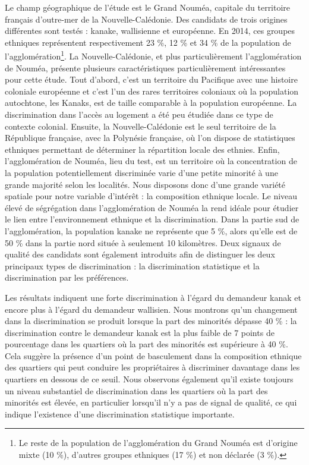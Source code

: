 \documentclass{Revue-economique} %
\begin{document}
\begin{Article}
Le champ géographique de l’étude est le Grand Nouméa, capitale du territoire français d’outre-mer de la Nouvelle-Calédonie. Des candidats de trois origines différentes sont testés : kanake, wallisienne et européenne. En 2014, ces groupes ethniques représentent respectivement 23 \%, 12 \% et 34 \% de la population de l’agglomération\footnote{Le reste de la population de l’agglomération du Grand Nouméa est d’origine mixte (10 \%), d’autres groupes ethniques (17 \%) et non déclarée (3 \%).}. La Nouvelle-Calédonie, et plus particulièrement l’agglomération de Nouméa, présente plusieurs caractéristiques particulièrement intéressantes pour cette étude. Tout d’abord, c’est un territoire du Pacifique avec une histoire coloniale européenne et c’est l’un des rares territoires coloniaux où la population autochtone, les Kanaks, est de taille comparable à la population européenne. La discrimination dans l’accès au logement a été peu étudiée dans ce type de contexte colonial. Ensuite, la Nouvelle-Calédonie est le seul territoire de la République française, avec la Polynésie française, où l’on dispose de statistiques ethniques permettant de déterminer la répartition locale des ethnies. Enfin, l’agglomération de Nouméa, lieu du test, est un territoire où la concentration de la population potentiellement discriminée varie d’une petite minorité à une grande majorité selon les localités. Nous disposons donc d’une grande variété spatiale pour notre variable d’intérêt : la composition ethnique locale. Le niveau élevé de ségrégation dans l’agglomération de Nouméa la rend idéale pour étudier le lien entre l’environnement ethnique et la discrimination. Dans la partie sud de l’agglomération, la population kanake ne représente que 5 \%, alors qu’elle est de 50 \% dans la partie nord située à seulement 10 kilomètres. Deux signaux de qualité des candidats sont également introduits afin de distinguer les deux principaux types de discrimination : la discrimination statistique et la discrimination par les préférences.

Les résultats indiquent une forte discrimination à l’égard du demandeur kanak et encore plus à l’égard du demandeur wallisien. Nous montrons qu’un changement dans la discrimination se produit lorsque la part des minorités dépasse 40 \% : la discrimination contre le demandeur kanak est la plus faible de 7 points de pourcentage dans les quartiers où la part des minorités est supérieure à 40 \%. Cela suggère la présence d’un point de basculement dans la composition ethnique des quartiers qui peut conduire les propriétaires à discriminer davantage dans les quartiers en dessous de ce seuil. Nous observons également qu’il existe toujours un niveau substantiel de discrimination dans les quartiers où la part des minorités est élevée, en particulier lorsqu’il n’y a pas de signal de qualité, ce qui indique l’existence d’une discrimination statistique importante.


\end{Article}
\end{document}
